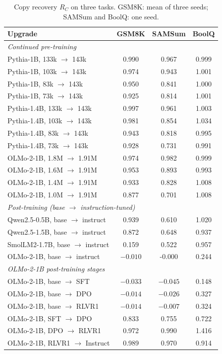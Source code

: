 \documentclass[ijds,blindrev]{informs4}
\begin{document}
\begin{table}[t]
\centering
\caption{Copy recovery $R_C$ on three tasks. GSM8K: mean of three seeds; SAMSum and BoolQ: one seed.}\label{tab:tasks}
\small
\begin{tabular}{lccc}
\toprule
Upgrade & GSM8K & SAMSum & BoolQ\\
\midrule
\multicolumn{4}{l}{\emph{Continued pre-training}}\\
Pythia-1B, 133k $\to$ 143k & 0.990 & 0.967 & 0.999\\
Pythia-1B, 103k $\to$ 143k & 0.974 & 0.943 & 1.001\\
Pythia-1B, 83k $\to$ 143k & 0.950 & 0.841 & 1.000\\
Pythia-1B, 73k $\to$ 143k & 0.925 & 0.814 & 1.001\\
Pythia-1.4B, 133k $\to$ 143k & 0.997 & 0.961 & 1.003\\
Pythia-1.4B, 103k $\to$ 143k & 0.981 & 0.854 & 1.034\\
Pythia-1.4B, 83k $\to$ 143k & 0.943 & 0.818 & 0.995\\
Pythia-1.4B, 73k $\to$ 143k & 0.928 & 0.731 & 0.991\\
OLMo-2-1B, 1.8M $\to$ 1.91M & 0.974 & 0.982 & 0.999\\
OLMo-2-1B, 1.6M $\to$ 1.91M & 0.953 & 0.893 & 0.993\\
OLMo-2-1B, 1.4M $\to$ 1.91M & 0.933 & 0.828 & 1.008\\
OLMo-2-1B, 1.0M $\to$ 1.91M & 0.877 & 0.701 & 1.008\\
\multicolumn{4}{l}{\emph{Post-training (base $\to$ instruction-tuned)}}\\
Qwen2.5-0.5B, base $\to$ instruct & 0.939 & 0.610 & 1.020\\
Qwen2.5-1.5B, base $\to$ instruct & 0.872 & 0.648 & 0.937\\
SmolLM2-1.7B, base $\to$ instruct & 0.159 & 0.522 & 0.957\\
OLMo-2-1B, base $\to$ instruct & $-0.010$ & -0.000 & 0.244\\
\multicolumn{4}{l}{\emph{OLMo-2-1B post-training stages}}\\
OLMo-2-1B, base $\to$ SFT & $-0.033$ & $-0.045$ & 0.148\\
OLMo-2-1B, base $\to$ DPO & $-0.014$ & $-0.026$ & 0.327\\
OLMo-2-1B, base $\to$ RLVR1 & $-0.014$ & $-0.007$ & 0.324\\
OLMo-2-1B, SFT $\to$ DPO & 0.833 & 0.755 & 0.722\\
OLMo-2-1B, DPO $\to$ RLVR1 & 0.972 & 0.990 & 1.416\\
OLMo-2-1B, RLVR1 $\to$ Instruct & 0.989 & 0.970 & 0.914\\
\bottomrule
\end{tabular}
\end{table}
\end{document}
